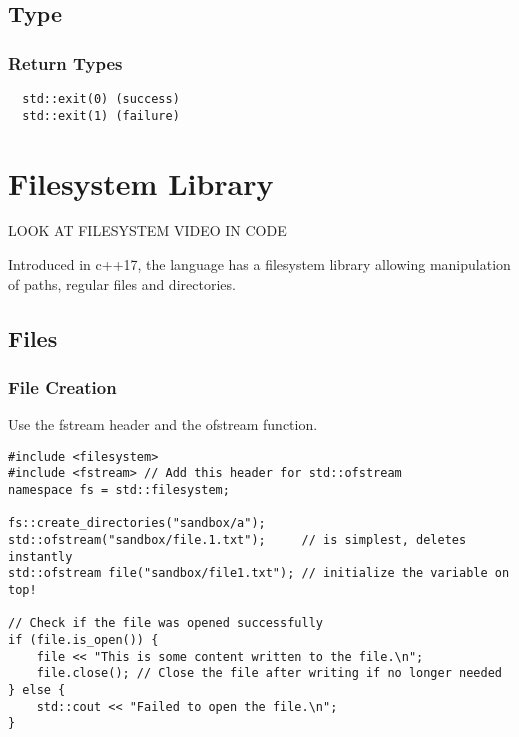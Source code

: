 \section{Type}

\subsection{Return Types}

\begin{verbatim}
  std::exit(0) (success)
  std::exit(1) (failure)
\end{verbatim}

\chapter{Filesystem Library}

LOOK AT FILESYSTEM VIDEO IN CODE

Introduced in c++17, the language has a filesystem library allowing
manipulation of paths, regular files and directories.

\section{Files}

\subsection{File Creation}

Use the fstream header and the ofstream function.

\begin{verbatim}
#include <filesystem>
#include <fstream> // Add this header for std::ofstream
namespace fs = std::filesystem;

fs::create_directories("sandbox/a");
std::ofstream("sandbox/file.1.txt");     // is simplest, deletes instantly
std::ofstream file("sandbox/file1.txt"); // initialize the variable on top!

// Check if the file was opened successfully
if (file.is_open()) {
    file << "This is some content written to the file.\n";
    file.close(); // Close the file after writing if no longer needed
} else {
    std::cout << "Failed to open the file.\n";
}
\end{verbatim}

